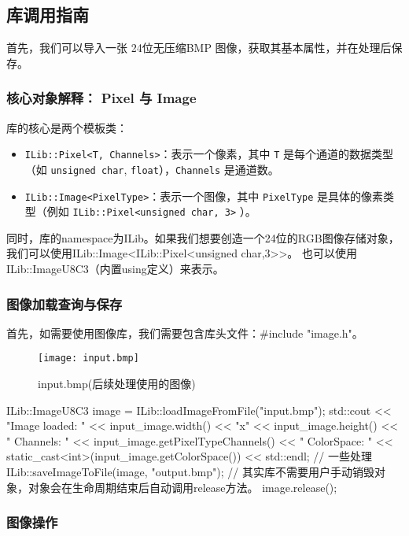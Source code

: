 \documentclass[11pt]{article}
\begin{document}
\subsection{库调用指南}
首先，我们可以导入一张 24位无压缩BMP 图像，获取其基本属性，并在处理后保存。

\subsubsection{核心对象解释： Pixel 与 Image}
库的核心是两个模板类：
\begin{itemize}
  \item \texttt{ILib::Pixel<T, Channels>}：表示一个像素，其中 \texttt{T} 是每个通道的数据类型（如 \texttt{unsigned char}, \texttt{float}），\texttt{Channels} 是通道数。
  \item \texttt{ILib::Image<PixelType>}：表示一个图像，其中 \texttt{PixelType} 是具体的像素类型（例如 \texttt{ILib::Pixel<unsigned char, 3>} ）。
\end{itemize}
同时，库的namespace为ILib。如果我们想要创造一个24位的RGB图像存储对象，我们可以使用ILib::Image<ILib::Pixel<unsigned char,3>>。
也可以使用ILib::ImageU8C3（内置using定义）来表示。

\subsubsection{图像加载查询与保存}
首先，如需要使用图像库，我们需要包含库头文件：\#include "image.h"。
\begin{figure}[H]
  \centering
  \texttt{[image: input.bmp]}
  \caption{input.bmp(后续处理使用的图像)}
  \label{fig:input}
\end{figure}

\begin{commandline}
    ILib::ImageU8C3 image = ILib::loadImageFromFile("input.bmp");
    std::cout << "Image loaded: " << input_image.width() << "x" << input_image.height()
    << " Channels: " << input_image.getPixelTypeChannels()
    << " ColorSpace: " << static_cast<int>(input_image.getColorSpace()) << std::endl;
    // 一些处理 
    ILib::saveImageToFile(image, "output.bmp");
    // 其实库不需要用户手动销毁对象，对象会在生命周期结束后自动调用release方法。
    image.release();
\end{commandline}


\subsubsection{图像操作}
\end{document}

